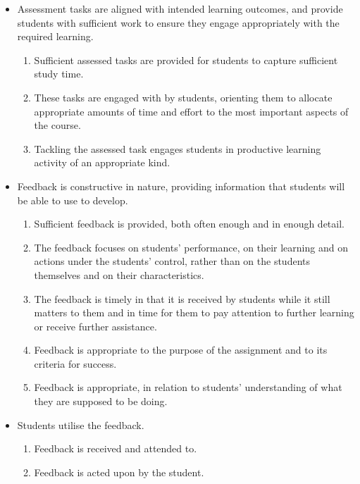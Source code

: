 \begin{itemize}[noitemsep,nolistsep]
	\item Assessment tasks are aligned with intended learning outcomes, and provide students with sufficient work to ensure they engage appropriately with the required learning.
	\begin{enumerate}
		\item Sufficient assessed tasks are provided for students to capture sufficient study time.
		\item These tasks are engaged with by students, orienting them to allocate appropriate amounts of time and effort to the most important aspects of the course.
		\item Tackling the assessed task engages students in productive learning activity of an appropriate kind.
	\end{enumerate}
	\item Feedback is constructive in nature, providing information that students will be able to use to develop.
	\begin{enumerate}[noitemsep,nolistsep,start=4]
		\item Sufficient feedback is provided, both often enough and in enough detail.
		\item The feedback focuses on students' performance, on their learning and on actions under the students' control, rather than on the students themselves and on their characteristics.
		\item The feedback is timely in that it is received by students while it still matters to them and in time for them to pay attention to further learning or receive further assistance.
		\item Feedback is appropriate to the purpose of the assignment and to its criteria for success.
		\item Feedback is appropriate, in relation to students' understanding of what they are supposed to be doing.
	\end{enumerate}
	\item Students utilise the feedback.
	\begin{enumerate}[noitemsep,nolistsep,start=9]
		\item Feedback is received and attended to.
		\item Feedback is acted upon by the student.
	\end{enumerate}
\end{itemize}


